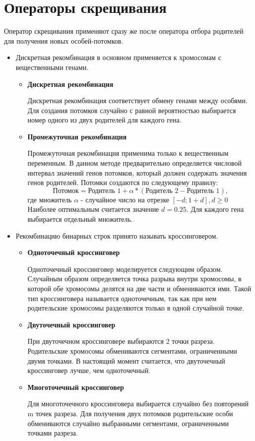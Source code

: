 \section{Операторы скрещивания}
Оператор скрещивания применяют сразу же после оператора отбора родителей для получения новых особей-потомков.
\begin{itemize}[label=$\ast$]
	\item {}

Дискретная рекомбинация в основном применяется к хромосомам с вещественными генами.
	\begin{itemize}[label=$-$]
		\item \textbf{Дискретная рекомбинация}

Дискретная рекомбинация соответствует обмену генами между особями. Для создания потомков случайно с равной вероятностью выбирается номер одного из двух родителей для каждого гена.
		\item \textbf{Промежуточная рекомбинация}

Промежуточная рекомбинация применима только к вещественным переменным. В данном методе предварительно определяется числовой интервал значений генов потомков, который должен содержать значения генов родителей. Потомки создаются по следующему правилу:
\begin{equation}
	\textrm{Потомок} = \textrm{Родитель 1} + \alpha \ast (\textrm{Родитель 2} - \textrm{Родитель 1}),
\end{equation}
где множитель $\alpha$ - случайное число на отрезке $[-d; 1 + d], d \geq 0$
Наиболее оптимальным считается значение $d = 0.25$. Для каждого гена выбирается отдельный множитель. 
	\end{itemize}
	\item {}

Рекомбинацию бинарных строк принято называть кроссинговером.
	\begin{itemize}[label=$-$]
		\item \textbf{Одноточечный кроссинговер}

Одноточечный кроссинговер моделируется следующим образом. Случайным образом определяется точка разрыва внутри хромосомы, в которой обе хромосомы делятся на две части и обмениваются ими. Такой тип кроссинговера называется одноточечным, так как при нем родительские хромосомы разделяются только в одной случайной точке.
		\item \textbf{Двуточечный кроссинговер}

При двуточечном кроссинговере выбираются 2 точки разреза. Родительские хромосомы обмениваются сегментами, ограниченными двумя точками. В настоящий момент считается, что двуточечный кроссинговер лучше, чем одноточечный.
		\item \textbf{Многоточечный кроссинговер}

Для многоточечного кроссинговера выбирается случайно без повторений m точек разреза. Для получения двух потомков родительские особи обмениваются случайно выбранными сегментами, ограниченными точками разреза.
	\end{itemize}
\end{itemize}

